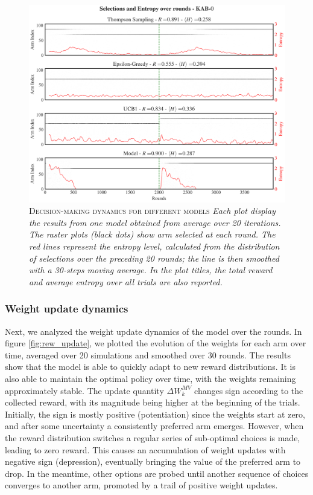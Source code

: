 \begin{figure}[H]
    \centering
    \includegraphics[width=1.0\textwidth]{figures/selections_entropy_KABv0.png}
    \caption{\textsc{Decision-making dynamics for different models} \textit{Each plot display the results from one model obtained from average over 20 iterations. The raster plots (black dots) show arm selected at each round. The red lines represent the entropy level, calculated from the distribution of selections over the preceding 20
    rounds; the line is then smoothed with a 30-steps moving average. In the plot titles, the total reward and average entropy over all trials are also reported.}}
    \label{fig:entropy_fig1}
\end{figure}


\subsubsection{Weight update dynamics}
\noindent Next, we analyzed the weight update dynamics of the model over the rounds.
In figure \ref{fig:rew_update}, we plotted the evolution of the weights for each arm over time, averaged over 20 simulations and smoothed over 30 rounds.
The results show that the model is able to quickly adapt to new reward distributions. It is also able to maintain the optimal policy over time, with the weights remaining approximately stable.
The update quantity $\Delta W_{k}^{MV}$ changes sign according to the collected reward, with its magnitude being higher at the beginning of the trials.
Initially, the sign is mostly positive (potentiation) since the weights start at zero, and after some uncertainty a consistently preferred arm emerges.
However, when the reward distribution switches a regular series of sub-optimal choices is made, leading to zero reward.
This causes an accumulation of weight updates with negative sign (depression), eventually bringing the value of the preferred arm to drop. In the meantime, other options are probed until another sequence of choices converges to another arm, promoted by a trail of positive weight updates.

